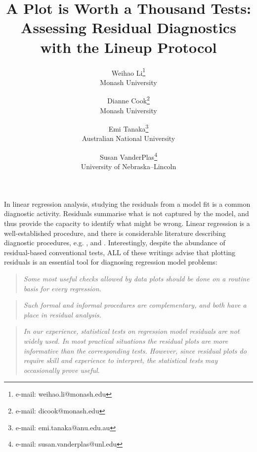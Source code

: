 \documentclass{vgtc}                          %
\title{A Plot is Worth a Thousand Tests: Assessing Residual Diagnostics with the Lineup Protocol}
\author{Weihao Li\thanks{e-mail: weihao.li@monash.edu}\\ %
        \scriptsize Monash University %
\and Dianne Cook\thanks{e-mail: dicook@monash.edu}\\ %
     \scriptsize Monash University %
\and Emi Tanaka\thanks{e-mail: emi.tanaka@anu.edu.au}\\ %
     \scriptsize Australian National University %
\and Susan VanderPlas\thanks{e-mail: susan.vanderplas@unl.edu}\\ %
     \scriptsize University of Nebraska–Lincoln}
\begin{document}


\maketitle


In linear regression analysis, studying the residuals from a model fit is a common
diagnostic activity. Residuals summarise what is not captured by the
model, and thus provide the capacity to identify what might be wrong. 
Linear regression is a well-established procedure, and there is
considerable literature describing diagnostic procedures, e.g.
\cite{draper1998applied}, \cite{montgomery1982introduction} and
\cite{cook1982residuals}. Interestingly, despite the abundance of
residual-based conventional tests, ALL of these writings advise that 
plotting residuals is an essential tool for diagnosing regression model 
problems:

\begin{quote}
\emph{Some most useful checks allowed by data plots should be done on a
routine basis for every regression.} \cite{draper1998applied}
\end{quote}

\begin{quote}
\emph{Such formal and informal procedures are complementary, and both
have a place in residual analysis.} \cite{cook1982residuals}
\end{quote}

\begin{quote}
\emph{In our experience, statistical tests on regression model residuals
are not widely used. In most practical situations the residual plots are
more informative than the corresponding tests. However, since residual
plots do require skill and experience to interpret, the statistical
tests may occasionally prove useful.} \cite{montgomery1982introduction}
\end{quote}
\end{document}
